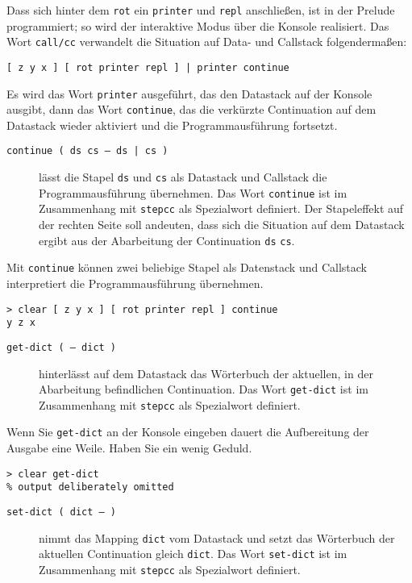 Dass sich hinter dem \verb|rot| ein \verb|printer| und \verb|repl| anschließen, ist in der Prelude programmiert; so wird der interaktive Modus über die Konsole realisiert. Das Wort \verb|call/cc| verwandelt die Situation auf Data- und Callstack folgendermaßen:

\begin{verbatim}
[ z y x ] [ rot printer repl ] | printer continue
\end{verbatim}

Es wird das Wort \verb|printer| ausgeführt, das den Datastack auf der Konsole ausgibt, dann das Wort \verb|continue|, das die verkürzte Continuation auf dem Datastack wieder aktiviert und die Programmausführung fortsetzt.

\begin{description}
\item[\texttt{continue ( ds cs -- ds | cs )}] lässt die Stapel \verb|ds| und \verb|cs| als Datastack und Callstack die Programmausführung übernehmen. Das Wort \verb|continue| ist im Zusammenhang mit \verb|stepcc| als Spezialwort definiert. Der Stapeleffekt auf der rechten Seite soll andeuten, dass sich die Situation auf dem Datastack ergibt aus der Abarbeitung der Continuation \verb|ds| \verb|cs|.
\end{description}

Mit \verb|continue| können zwei beliebige Stapel als Datenstack und Callstack interpretiert die Programmausführung übernehmen.

\begin{verbatim}
> clear [ z y x ] [ rot printer repl ] continue
y z x
\end{verbatim}

\begin{description}
\item[\texttt{get-dict ( -- dict )}] hinterlässt auf dem Datastack das Wörterbuch der aktuellen, in der Abarbeitung befindlichen Continuation. Das Wort \verb|get-dict| ist im Zusammenhang mit \verb|stepcc| als Spezialwort definiert.
\end{description}

Wenn Sie \verb|get-dict| an der Konsole eingeben dauert die Aufbereitung der Ausgabe eine Weile. Haben Sie ein wenig Geduld.

\begin{verbatim}
> clear get-dict
% output deliberately omitted
\end{verbatim}

\begin{description}
\item[\texttt{set-dict ( dict -- )}] nimmt das Mapping \verb|dict| vom Datastack und setzt das Wörterbuch der aktuellen Continuation gleich \verb|dict|. Das Wort \verb|set-dict| ist im Zusammenhang mit \verb|stepcc| als Spezialwort definiert.
\end{description}

